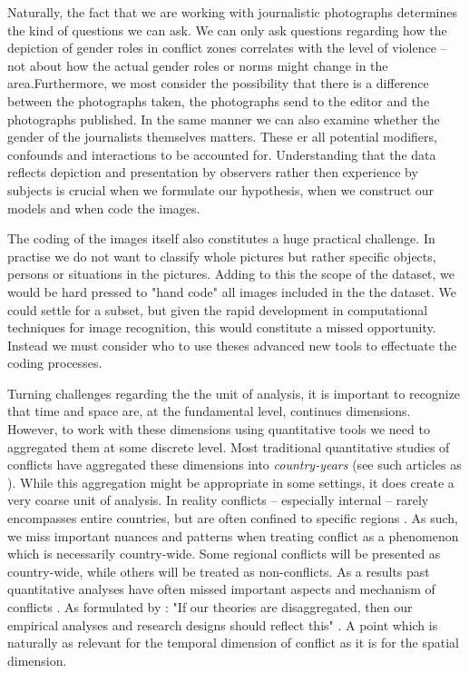 \documentclass[a4paper]{article}
\begin{document}
Naturally, the fact that we are working with journalistic photographs determines the kind of questions we can ask. We can only ask questions regarding how the depiction of gender roles in conflict zones correlates with the level of violence -- not about how the actual gender roles or norms might change in the area.Furthermore, we most consider the possibility that there is a difference between the photographs taken, the photographs send to the editor and the photographs published. In the same manner we can also examine whether the gender of the journalists themselves matters. These er all potential modifiers, confounds and interactions to be accounted for. Understanding that the data reflects depiction and presentation by observers rather then experience by subjects is crucial when we formulate our hypothesis, when we construct our models and when code the images.\par

The coding of the images itself also constitutes a huge practical challenge. In practise we do not want to classify whole pictures but rather specific objects, persons or situations in the pictures. Adding to this the scope of the dataset, we would be hard pressed to "hand code" all images included in the the dataset. We could settle for a subset, but given the rapid development in computational techniques for image recognition, this would constitute a missed opportunity. Instead we must consider who to use theses advanced new tools to effectuate the coding processes.\par 

Turning challenges regarding the the unit of analysis, it is important to recognize that time and space are, at the fundamental level, continues dimensions. However, to work with these dimensions using quantitative tools we need to aggregated them at some discrete level. Most traditional quantitative studies of conflicts have aggregated these dimensions into \emph{country-years} (see such articles as \cite{Collier_Hoeffler_1998, Fearon_Laitin_2003, Collier_Hoeffler_2004, Fearon_2004, Ross_2004, Fearon_2005, Hegre_Sambanis_2006, Goldstone_2010}). While this aggregation might be appropriate in some settings, it does create a very coarse unit of analysis. In reality conflicts -- especially internal -- rarely encompasses entire countries, but are often confined to specific regions \citep[487]{Cederman_Gleditsch_2009}. As such, we miss important nuances and patterns when treating conflict as a phenomenon which is necessarily country-wide. Some regional conflicts will be presented as country-wide, while others will be treated as non-conflicts. As a results past quantitative analyses have often missed important aspects and mechanism of conflicts \citep{Cederman_Gleditsch_2009, Cederman_Gleditsch_Buhaug_2013}. As formulated by \cite{Cederman_Gleditsch_2009}: "If our theories are disaggregated, then our empirical analyses and research designs should reflect this" \citep[490]{Cederman_Gleditsch_2009}. A point which is naturally as relevant for the temporal dimension of conflict as it is for the spatial dimension.\par 
\end{document}
